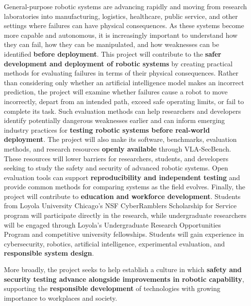 \documentclass[11pt,letterpaper]{article}
\begin{document}
General-purpose robotic systems are advancing rapidly and moving from research laboratories into manufacturing, logistics, healthcare, public service, and other settings where failures can have physical consequences. As these systems become more capable and autonomous, it is increasingly important to understand how they can fail, how they can be manipulated, and how weaknesses can be identified \textbf{before deployment}.
This project will contribute to the \textbf{safer development and deployment of robotic systems} by creating practical methods for evaluating failures in terms of their physical consequences. Rather than considering only whether an artificial intelligence model makes an incorrect prediction, the project will examine whether failures cause a robot to move incorrectly, depart from an intended path, exceed safe operating limits, or fail to complete its task. Such evaluation methods can help researchers and developers identify potentially dangerous weaknesses earlier and can inform emerging industry practices for \textbf{testing robotic systems before real-world deployment}.
The project will also make its software, benchmarks, evaluation methods, and research resources \textbf{openly available} through VLA-SecBench. These resources will lower barriers for researchers, students, and developers seeking to study the safety and security of advanced robotic systems. Open evaluation tools can support \textbf{reproducibility and independent testing} and provide common methods for comparing systems as the field evolves.
Finally, the project will contribute to \textbf{education and workforce development}. Students from Loyola University Chicago's NSF CyberRamblers Scholarship for Service program will participate directly in the research, while undergraduate researchers will be engaged through Loyola's Undergraduate Research Opportunities Program and competitive university fellowships. Students will gain experience in cybersecurity, robotics, artificial intelligence, experimental evaluation, and \textbf{responsible system design}.

More broadly, the project seeks to help establish a culture in which \textbf{safety and security testing advance alongside improvements in robotic capability}, supporting the \textbf{responsible development} of technologies with growing importance to workplaces and society.



%


\newpage{}
\renewcommand\refname{References Cited}






\newpage{}


\newpage{}


\newpage{}


\newpage{}


\newpage{}


\newpage{}

\end{document}
